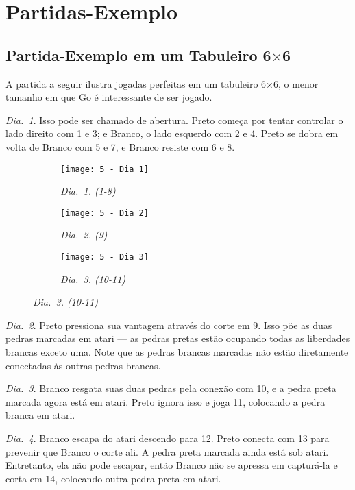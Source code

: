 \chapter{Partidas-Exemplo}\label{chap:cinco}

\section{Partida-Exemplo em um Tabuleiro \texorpdfstring{6$\times$6}{6x6}}

A partida a seguir ilustra jogadas perfeitas em um tabuleiro 6$\times$6, o menor tamanho em que Go é interessante de ser jogado.

\emph{Dia.\@~1}. Isso pode ser chamado de abertura. Preto começa por tentar controlar o lado direito com 1 e 3; e Branco, o lado esquerdo com 2 e 4. Preto se dobra em volta de Branco com 5 e 7, e Branco resiste com 6 e 8.

\begin{figure}[h!]
  \centering
  \begin{subfigure}[t]{.3\textwidth}
    \centering
    \texttt{[image: 5 - Dia 1]}
    \captionsetup{justification=centering}
    \caption*{\emph{Dia.\@~1. (1-8)}}
  \end{subfigure}
  \hfill
  \begin{subfigure}[t]{.3\textwidth}
    \centering
    \texttt{[image: 5 - Dia 2]}
    \captionsetup{justification=centering}
    \caption*{\emph{Dia.\@~2. (9)}}
  \end{subfigure}
  \hfill
  \begin{subfigure}[t]{.3\textwidth}
    \centering
    \texttt{[image: 5 - Dia 3]}
    \captionsetup{justification=centering}
    \caption*{\emph{Dia.\@~3. (10-11)}}
  \end{subfigure}
\end{figure}

\emph{Dia.\@~2}. Preto pressiona sua vantagem através do corte em 9. Isso põe as duas pedras marcadas em atari --- as pedras pretas estão ocupando todas as liberdades brancas exceto uma. Note que as pedras brancas marcadas não estão diretamente conectadas às outras pedras brancas.

\emph{Dia.\@~3}. Branco resgata suas duas pedras pela conexão com 10, e a pedra preta marcada agora está em atari. Preto ignora isso e joga 11, colocando a pedra branca em atari.

\pagebreak

\emph{Dia.\@~4}. Branco escapa do atari descendo para 12. Preto conecta com 13 para prevenir que Branco o corte ali. A pedra preta marcada ainda está sob atari. Entretanto, ela não pode escapar, então Branco não se apressa em capturá-la e corta em 14, colocando outra pedra preta em atari.


